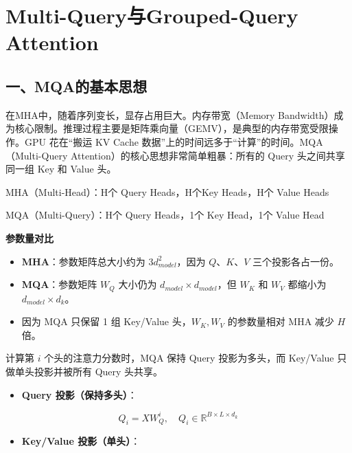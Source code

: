 \setcounter{section}{3}

\hypertarget{multi-queryux4e0egrouped-query-attention}{%
\section{Multi-Query与Grouped-Query Attention}\label{multi-queryux4e0egrouped-query-attention}}

\hypertarget{ux4e00mqaux7684ux57faux672cux601dux60f3}{%
\subsection{一、MQA的基本思想}\label{ux4e00mqaux7684ux57faux672cux601dux60f3}}

在MHA中，随着序列变长，显存占用巨大。内存带宽（Memory Bandwidth）成为核心限制。推理过程主要是矩阵乘向量（GEMV），是典型的内存带宽受限操作。GPU 花在``搬运 KV Cache 数据''上的时间远多于``计算''的时间。MQA（Multi-Query Attention）的核心思想非常简单粗暴：所有的 Query 头之间共享同一组 Key 和 Value 头。

MHA（Multi-Head）：H个 Query Heads，H个Key Heads，H个 Value Heads

MQA（Multi-Query）：H个 Query Heads，1个 Key Head，1个 Value Head

\textbf{参数量对比}

\begin{itemize}
\tightlist
\item
  \textbf{MHA}：参数矩阵总大小约为 \(3d_{model}^2\)，因为 \(Q\)、\(K\)、\(V\) 三个投影各占一份。
\item
  \textbf{MQA}：参数矩阵 \(W_Q\) 大小仍为 \(d_{model} \times d_{model}\)，但 \(W_K\) 和 \(W_V\) 都缩小为 \(d_{model} \times d_k\)。
\item
  因为 MQA 只保留 1 组 Key/Value 头，\(W_K,W_V\) 的参数量相对 MHA 减少 \(H\) 倍。
\end{itemize}

计算第 \(i\) 个头的注意力分数时，MQA 保持 Query 投影为多头，而 Key/Value 只做单头投影并被所有 Query 头共享。

\begin{itemize}
\tightlist
\item
{}
  \textbf{Query 投影（保持多头）}：
\end{itemize}

\[
Q_i = XW_Q^i, \quad Q_i \in \mathbb{R}^{B \times L \times d_k}
\]

\begin{itemize}
\tightlist
\item
{}
  \textbf{Key/Value 投影（单头）}：
\end{itemize}

